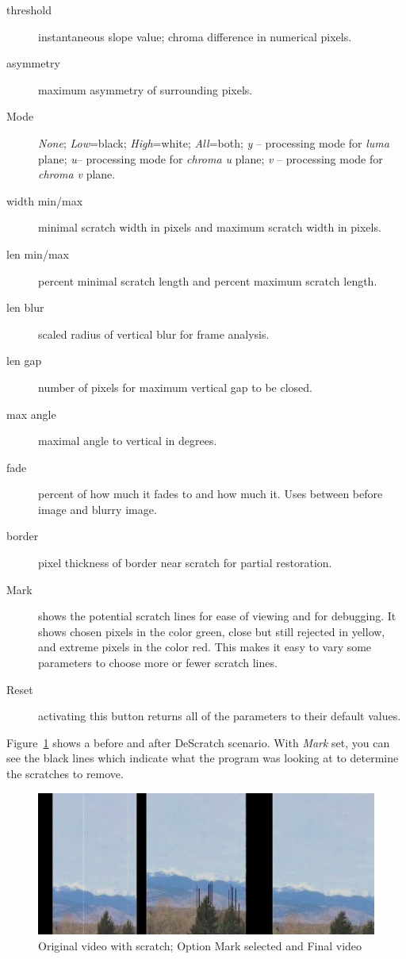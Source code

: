 \begin{description}
    \item[threshold] instantaneous slope value; chroma difference in numerical pixels.
    \item[asymmetry] maximum asymmetry of surrounding
    pixels.
    \item[Mode] \textit{None}; \textit{Low}=black; \textit{High}=white; \textit{All}=both;
    \textit{y} -- processing mode for \textit{luma} plane; 
    \textit{u}-- processing mode for \textit{chroma u} plane;
    \textit{v} -- processing mode for \textit{chroma v} plane.
    \item[width min/max] minimal scratch width in pixels and maximum scratch width in pixels.
    \item[len min/max] percent minimal scratch length and percent maximum scratch length.
    \item[len blur] scaled radius of vertical blur for frame
    analysis.
    \item[len gap] number of pixels for maximum vertical gap
    to be closed.
    \item[max angle] maximal angle to vertical in degrees.
    \item[fade] percent of how much it fades to and how much it. Uses between before image and blurry image.
    \item[border] pixel thickness of border near scratch for partial restoration.
    \item[Mark] shows the potential scratch lines for ease of viewing and for debugging. It shows chosen pixels in the color green, close but still rejected in yellow, and extreme pixels in the color red. This makes it easy to vary some parameters to choose more or fewer scratch lines.
    \item[Reset] activating this button returns all of the parameters to their default values.
\end{description}

Figure~\ref{fig:descratch} shows a before and after DeScratch scenario. With \textit{Mark} set, you can see the black lines which indicate what the program was looking at to determine the scratches to remove.

\begin{figure}[htpb]
    \centering
    \includegraphics[width=0.9\linewidth]{images/descratch.png}
    \caption{Original video with scratch; Option Mark selected and Final video}
    \label{fig:descratch}
\end{figure}

